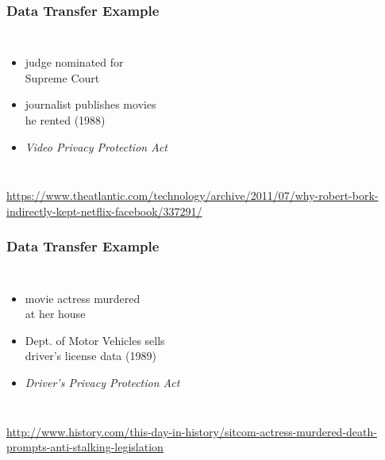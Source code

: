 \documentclass[dvipsnames]{beamer}
\theoremstyle{plain}
\begin{document}
\begin{frame}
  \frametitle{Data Transfer Example}

  \begin{columns}

    \begin{itemize}
      \item judge nominated for\\
        Supreme Court
      \item journalist publishes movies\\
        he rented (1988)

      \medskip
      \item \emph{Video Privacy Protection Act}
    \end{itemize}
  \end{columns}

  \medskip
  \tiny{\url{https://www.theatlantic.com/technology/archive/2011/07/why-robert-bork-indirectly-kept-netflix-facebook/337291/}}\\
\end{frame}

\begin{frame}
  \frametitle{Data Transfer Example}

  \begin{columns}

    \begin{itemize}
      \item movie actress murdered\\
        at her house
      \item Dept. of Motor Vehicles sells\\
        driver's license data (1989)

      \medskip
      \item \emph{Driver's Privacy Protection Act}
    \end{itemize}
  \end{columns}

  \medskip
  \tiny{\url{http://www.history.com/this-day-in-history/sitcom-actress-murdered-death-prompts-anti-stalking-legislation}}\\
\end{frame}
\end{document}
